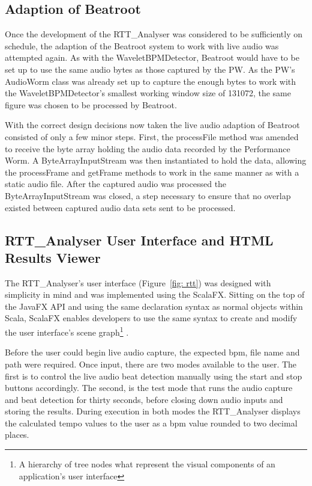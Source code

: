 \documentclass[a4paper, 11pt]{article}
\begin{document}
\subsection{Adaption of Beatroot}
Once the development of the RTT\_Analyser was considered to be sufficiently on schedule, the adaption of the Beatroot system to work with live audio was attempted again. As with the WaveletBPMDetector, Beatroot would have to be set up to use the same audio bytes as those captured by the PW. As the PW's AudioWorm class was already set up to capture the enough bytes to work with the WaveletBPMDetector's smallest working window size of 131072, the same figure was chosen to be processed by Beatroot. \par

With the correct design decisions now taken the live audio adaption of Beatroot consisted of only a few minor steps. First, the processFile method was amended to receive the byte array holding the audio data recorded by the Performance Worm. A ByteArrayInputStream was then instantiated to hold the data, allowing the processFrame and getFrame methods to work in the same manner as with a static audio file. After the captured audio was processed the ByteArrayInputStream was closed, a step necessary to ensure that no overlap existed between captured audio data sets sent to be processed.

\subsection{RTT\_Analyser User Interface and HTML Results Viewer}
The RTT\_Analyser's user interface (Figure~\ref{fig: rtt}) was designed with simplicity in mind and was implemented using the ScalaFX\cite{scalafx}. Sitting on the top of the JavaFX API and using the same declaration syntax as normal objects within Scala, ScalaFX enables developers to use the same syntax to create and modify the user interface's scene graph\footnote{A hierarchy of tree nodes what represent the visual components of an application's user interface\cite{oracle2}} \cite{scalafx}. \par

Before the user could begin live audio capture, the expected bpm, file name and path were required. Once input, there are two modes available to the user. The first is to control the live audio beat detection manually using the start and stop buttons accordingly. The second, is the test mode that runs the audio capture and beat detection for thirty seconds, before closing down audio inputs and storing the results. During execution in both modes the RTT\_Analyser displays the calculated tempo values to the user as a bpm value rounded to two decimal places. \par
\end{document}
